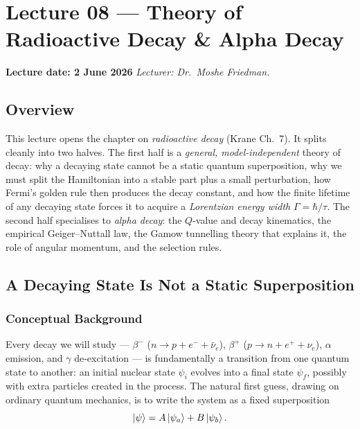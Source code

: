 
\section{Lecture 08 — Theory of Radioactive Decay \& Alpha Decay}
\label{sec:lec08}
\date{2 June 2026}

\noindent\textbf{\textcolor{doc}{Lecture date: 2 June 2026}}\quad\textemdash\quad
\textit{Lecturer: Dr.\ Moshe Friedman.}

\subsection*{Overview}
This lecture opens the chapter on \emph{radioactive decay} (Krane Ch.~7).  It
splits cleanly into two halves.  The first half is a \emph{general, model-independent}
theory of decay: why a decaying state cannot be a static quantum superposition,
why we must split the Hamiltonian into a stable part plus a small perturbation,
how Fermi's golden rule then produces the decay constant, and how the finite
lifetime of any decaying state forces it to acquire a \emph{Lorentzian energy
width} $\Gamma = \hbar/\tau$.  The second half specialises to \emph{alpha decay}:
the $Q$-value and decay kinematics, the empirical Geiger--Nuttall law, the Gamow
tunnelling theory that explains it, the role of angular momentum, and the
selection rules.

\subsection{A Decaying State Is Not a Static Superposition}
\label{subsec:lec08:not_superposition}

\subsubsection*{Conceptual Background}
Every decay we will study --- $\beta^-$ ($n\to p+e^-+\bar\nu_e$),
$\beta^+$ ($p\to n+e^++\nu_e$), $\alpha$ emission, and $\gamma$ de-excitation ---
is fundamentally a transition from one quantum state to another: an initial
nuclear state $\psi_i$ evolves into a final state $\psi_f$, possibly with extra
particles created in the process.  The natural first guess, drawing on ordinary
quantum mechanics, is to write the system as a fixed superposition
\begin{equation}
  \label{eq:lec08:bad_superposition}
  \ket{\psi} = A\ket{\psi_a} + B\ket{\psi_b}.
\end{equation}

